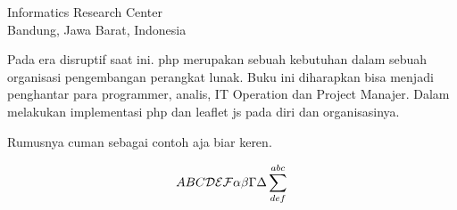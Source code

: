 

{Informatics Research Center\\
Bandung, Jawa Barat, Indonesia}

Pada era disruptif   
saat ini. php merupakan sebuah kebutuhan dalam sebuah organisasi pengembangan perangkat lunak.
Buku ini diharapkan bisa menjadi penghantar para programmer, analis, IT Operation dan Project Manajer.
Dalam melakukan implementasi php dan leaflet js pada diri dan organisasinya.

Rumusnya cuman sebagai contoh aja biar keren\cite{awangga2018sampeu}.

\begin{equation}
ABC {\cal DEF} \alpha\beta\Gamma\Delta\sum^{abc}_{def}
\end{equation}
